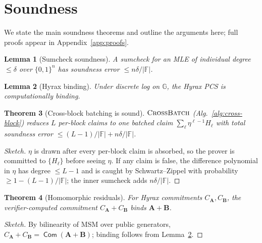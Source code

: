 \documentclass[letterpaper,twocolumn,10pt]{article}
\newtheorem{theorem}{Theorem}
\newtheorem{lemma}[theorem]{Lemma}
\theoremstyle{remark}
\theoremstyle{definition}
\newcommand{\FF}{\mathbb{F}}
\newcommand{\GG}{\mathbb{G}}
\newcommand{\bA}{\mathbf{A}}
\newcommand{\bB}{\mathbf{B}}
\DeclareMathOperator{\Com}{\mathsf{Com}}
\begin{document}
\section{Soundness}
\label{sec:soundness}

We state the main soundness theorems and outline the arguments here;
full proofs appear in Appendix~\ref{app:proofs}.

\begin{lemma}[Sumcheck soundness]
\label{lem:sumcheck}
A sumcheck for an MLE of individual degree $\le\delta$ over
$\{0,1\}^n$ has soundness error $\le n\delta/|\FF|$.
\end{lemma}

\begin{lemma}[Hyrax binding]
\label{lem:hyrax}
Under discrete log on $\GG$, the Hyrax PCS is computationally binding.
\end{lemma}

\begin{theorem}[Cross-block batching is sound]
\label{thm:cross-block}
$\textsc{CrossBatch}$ (Alg.~\ref{alg:cross-block}) reduces $L$
per-block claims to one batched claim
$\sum_\ell\eta^{\ell-1}H_\ell$ with total soundness error
$\le (L\!-\!1)/|\FF| + n\delta/|\FF|$.
\end{theorem}
\begin{proof}[Sketch]
$\eta$ is drawn after every per-block claim is absorbed, so the prover
is committed to $\{H_\ell\}$ before seeing $\eta$. If any claim is
false, the difference polynomial in $\eta$ has degree $\le L\!-\!1$
and is caught by Schwartz--Zippel with probability $\ge 1\!-\!(L\!-\!1)/|\FF|$;
the inner sumcheck adds $n\delta/|\FF|$.
\end{proof}

\begin{theorem}[Homomorphic residuals]
\label{thm:residual}
For Hyrax commitments $C_\bA,C_\bB$, the verifier-computed commitment
$C_\bA\!+\!C_\bB$ binds $\bA\!+\!\bB$.
\end{theorem}
\begin{proof}[Sketch]
By bilinearity of MSM over public generators,
$C_\bA\!+\!C_\bB\!=\!\Com(\bA\!+\!\bB)$; binding follows from
Lemma~\ref{lem:hyrax}.
\end{proof}
\end{document}
